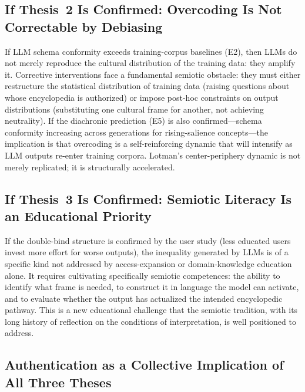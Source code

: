 \documentclass[12pt,a4paper]{article}
\begin{document}
\subsection{If Thesis~2 Is Confirmed: Overcoding Is Not Correctable by Debiasing}

If LLM schema conformity exceeds training-corpus baselines (E2), then LLMs
do not merely reproduce the cultural distribution of the training data: they
amplify it. Corrective interventions face a fundamental semiotic obstacle:
they must either restructure the statistical distribution of training data
(raising questions about whose encyclopedia is authorized) or impose post-hoc
constraints on output distributions (substituting one cultural frame for
another, not achieving neutrality). If the diachronic prediction (E5) is
also confirmed---schema conformity increasing across generations for
rising-salience concepts---the implication is that overcoding is a self-reinforcing
dynamic that will intensify as LLM outputs re-enter training corpora. Lotman's
center-periphery dynamic \citep{Lotman1990} is not merely replicated; it is
structurally accelerated.

\subsection{If Thesis~3 Is Confirmed: Semiotic Literacy Is an Educational Priority}

If the double-bind structure is confirmed by the user study (less educated
users invest more effort for worse outputs), the inequality generated by LLMs
is of a specific kind not addressed by access-expansion or domain-knowledge
education alone. It requires cultivating specifically semiotic competences:
the ability to identify what frame is needed, to construct it in language the
model can activate, and to evaluate whether the output has actualized the
intended encyclopedic pathway. This is a new educational challenge that the
semiotic tradition, with its long history of reflection on the conditions of
interpretation, is well positioned to address.

\subsection{Authentication as a Collective Implication of All Three Theses}
\end{document}
